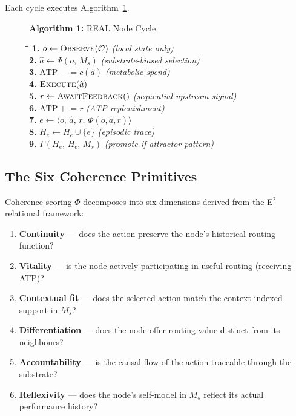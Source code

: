 \documentclass[10pt,twocolumn]{article}
\newcommand{\atp}{\mathrm{ATP}}
\newcommand{\He}{H_e}
\newcommand{\Hc}{H_c}
\newcommand{\Ms}{M_s}
\begin{document}
Each cycle executes Algorithm~\ref{alg:real_cycle}.

\begin{figure}[t]
\small
\textbf{Algorithm 1:} REAL Node Cycle\\[4pt]
\begin{tabbing}
\quad\=\quad\=\quad\=\kill
\textbf{1.} \> $o \leftarrow \textsc{Observe}(\mathcal{O})$
              \hfill\textit{(local state only)} \\
\textbf{2.} \> $\hat{a} \leftarrow \Psi(o,\,\Ms)$
              \hfill\textit{(substrate-biased selection)} \\
\textbf{3.} \> $\atp \mathrel{-}= c(\hat{a})$
              \hfill\textit{(metabolic spend)} \\
\textbf{4.} \> $\textsc{Execute}(\hat{a})$ \\
\textbf{5.} \> $r \leftarrow \textsc{AwaitFeedback}()$
              \hfill\textit{(sequential upstream signal)} \\
\textbf{6.} \> $\atp \mathrel{+}= r$
              \hfill\textit{(ATP replenishment)} \\
\textbf{7.} \> $e \leftarrow \langle o,\,\hat{a},\,r,\,\Phi(o,\hat{a},r)\rangle$ \\
\textbf{8.} \> $\He \leftarrow \He \cup \{e\}$
              \hfill\textit{(episodic trace)} \\
\textbf{9.} \> $\Gamma(\He,\,\Hc,\,\Ms)$
              \hfill\textit{(promote if attractor pattern)}
\end{tabbing}
\label{alg:real_cycle}
\end{figure}

\subsection{The Six Coherence Primitives}

Coherence scoring $\Phi$ decomposes into six dimensions derived from the
E$^2$ relational framework:

\begin{enumerate}[leftmargin=*, itemsep=1pt]
  \item \textbf{Continuity} --- does the action preserve the node's historical
        routing function?
  \item \textbf{Vitality} --- is the node actively participating in useful
        routing (receiving ATP)?
  \item \textbf{Contextual fit} --- does the selected action match the
        context-indexed support in $\Ms$?
  \item \textbf{Differentiation} --- does the node offer routing value distinct
        from its neighbours?
  \item \textbf{Accountability} --- is the causal flow of the action traceable
        through the substrate?
  \item \textbf{Reflexivity} --- does the node's self-model in $\Ms$ reflect its
        actual performance history?
\end{enumerate}
\end{document}
